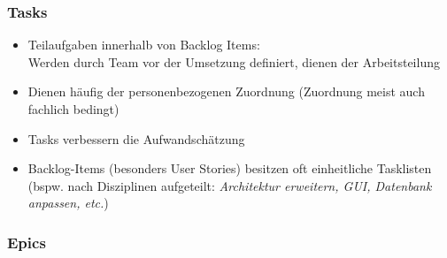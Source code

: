 \documentclass[a4paper]{article}
\begin{document}
			\subsubsection{Tasks}
			
			\begin{itemize}
				\item Teilaufgaben innerhalb von Backlog Items:\\
					Werden durch Team vor der Umsetzung definiert, dienen der Arbeitsteilung
				\item Dienen häufig der personenbezogenen Zuordnung (Zuordnung meist auch fachlich bedingt)
				\item Tasks verbessern die Aufwandschätzung
				\item Backlog-Items (besonders User Stories) besitzen oft einheitliche Tasklisten\\
				(bspw. nach Disziplinen aufgeteilt: \textit{Architektur erweitern, GUI, Datenbank anpassen, etc.})
			\end{itemize}
			
			\subsubsection{Epics}
			
\end{document}
